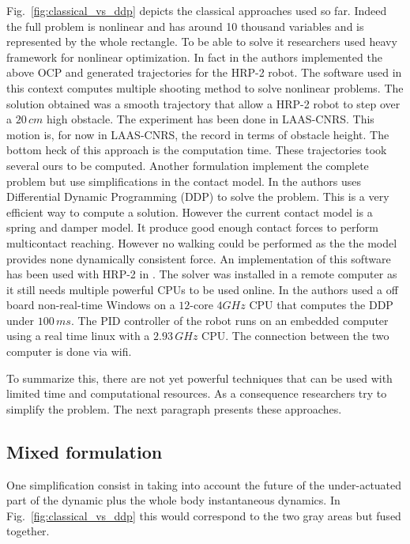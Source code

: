 Fig.~\ref{fig:classical_vs_ddp} depicts the classical approaches used so far.
Indeed the full problem is nonlinear and has around 10 thousand variables and is represented by the whole rectangle.
To be able to solve it researchers used heavy framework for nonlinear optimization.
In fact in \cite{koch:ichr:2014} the authors implemented the above OCP and generated trajectories for the HRP-2 robot.
The software used in this context computes multiple shooting method to solve nonlinear problems.
The solution obtained was a smooth trajectory that allow a HRP-2 robot to step over a $20\,cm$ high obstacle.
The experiment has been done in LAAS-CNRS.
This motion is, for now in LAAS-CNRS, the record in terms of obstacle height.
The bottom heck of this approach is the computation time.
These trajectories took several ours to be computed.
Another formulation implement the complete problem but use simplifications in the contact model.
In \cite{tassa:icra:14} the authors uses Differential Dynamic Programming (DDP) to solve the problem.
This is a very efficient way to compute a solution.
However the current contact model is a spring and damper model.
It produce good enough contact forces to perform multicontact reaching.
However no walking could be performed as the the model provides none dynamically consistent force.
An implementation of this software has been used with HRP-2 in \cite{Koenemann:iros:2015}.
The solver was installed in a remote computer as it still needs multiple powerful CPUs to be used online.
In \cite{Koenemann:iros:2015} the authors used a off board non-real-time Windows
on a $12$-core $4 GHz$ CPU that computes the DDP under $100\,ms$.
The PID controller of the robot runs on an embedded computer using a real time linux with a $2.93\,GHz$ CPU.
The connection between the two computer is done via wifi.

To summarize this, there are not yet powerful techniques that can be used with limited time and computational resources.
As a consequence researchers try to simplify the problem.
The next paragraph presents these approaches.

\subsection*{Mixed formulation}

One simplification consist in taking into account the future of the under-actuated part of the dynamic plus the whole body instantaneous dynamics.
In Fig.~\ref{fig:classical_vs_ddp} this would correspond to the two gray areas but fused together.

